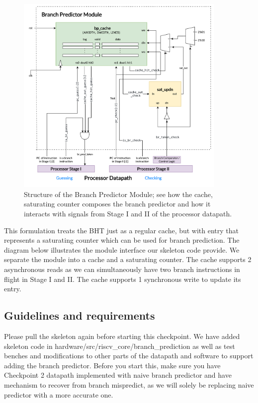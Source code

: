 \begin{figure}[hbt]
  \begin{center}
    \includegraphics[width=0.9\textwidth]{figs/branch_predictor.png}
    \caption{Structure of the Branch Predictor Module; see how the cache, saturating counter composes the branch predictor and how it interacts with signals from Stage I and II of the processor datapath.}
  \end{center}
\end{figure}


This formulation treats the BHT just as a regular cache, but with entry that represents a saturating counter which can be used for branch prediction. The diagram below illustrates the module interface our skeleton code provide. We separate the module into a cache and a saturating counter. The cache supports 2 asynchronous reads as we can simultaneously have two branch instructions in flight in Stage I and II. The cache supports 1 synchronous write to update its entry. 

\subsection{Guidelines and requirements}
Please pull the skeleton again before starting this checkpoint. We have added skeleton code in  hardware/src/riscv\_core/branch\_prediction as well as test benches and modifications to other parts of the datapath and software to support adding the branch predictor. Before you start this, make sure you have Checkpoint 2 datapath implemented with naive branch predictor and have mechanism to recover from branch mispredict, as we will solely be replacing naive predictor with a more accurate one.


